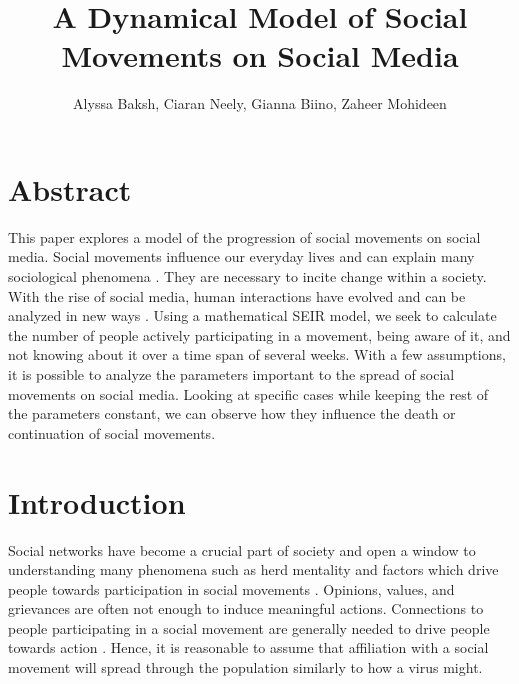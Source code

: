 \documentclass{article}
\title{A Dynamical Model of Social Movements on Social Media}
\author{
    Alyssa Baksh, 
    Ciaran Neely,
    Gianna Biino,
    Zaheer Mohideen
}
\begin{document}
    \maketitle

    \section{Abstract}
    This paper explores a model of the progression of social movements on social media. Social movements influence our everyday lives and can explain many sociological phenomena \cite{diani_networks_2013}. They are necessary to incite change within a society. With the rise of social media, human interactions have evolved and can be analyzed in new ways \cite{kidd_social_2016}. Using a mathematical SEIR model, we seek to calculate the number of people actively participating in a movement, being aware of it, and not knowing about it over a time span of several weeks. With a few assumptions, it is possible to analyze the parameters important to the spread of social movements on social media. Looking at specific cases while keeping the rest of the parameters constant, we can observe how they influence the death or continuation of social movements. 
    
    \section{Introduction}
    Social networks have become a crucial part of society and open a window to understanding many phenomena such as herd mentality and factors which drive people towards participation in social movements \cite{diani_networks_2013}. Opinions, values, and grievances are often not enough to induce meaningful actions. Connections to people participating in a social movement are generally needed to drive people towards action \cite{small_movements_2021}. Hence, it is reasonable to assume that affiliation with a social movement will spread through the population similarly to how a virus might.
    
\end{document}
